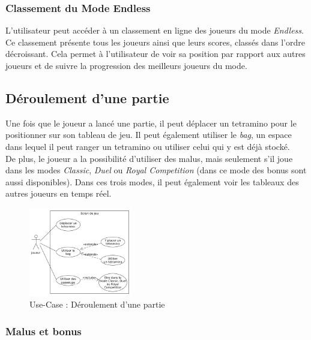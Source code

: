 \documentclass{report}
\begin{document}
\subsubsection{Classement du Mode Endless}

\noindent L'utilisateur peut accéder à un classement en ligne des joueurs du mode \emph{Endless}. Ce classement présente tous les joueurs ainsi que leurs scores, classés dans l'ordre décroissant. Cela permet à l'utilisateur de voir sa position par rapport aux autres joueurs et de suivre la progression des meilleurs joueurs du mode.





\subsection{Déroulement d’une partie}

\noindent Une fois que le joueur a lancé une partie, il peut déplacer un tetramino pour le positionner sur son tableau de jeu. Il peut également utiliser le \emph{bag}, un espace dans lequel il peut ranger un tetramino ou utiliser celui qui y est déjà stocké. \\

\noindent De plus, le joueur a la possibilité d'utiliser des malus, mais seulement s'il joue dans les modes \emph{Classic}, \emph{Duel} ou \emph{Royal Competition} (dans ce mode des bonus sont aussi disponibles). Dans ces trois modes, il peut également voir les tableaux des autres joueurs en temps réel.

\begin{figure}[H]
    \centering
     \includegraphics[width=0.4\textwidth, keepaspectratio]{src/user_req/jeu.png}
    \caption{Use-Case : Déroulement d'une partie}
    \label{fig:use_case_game}
\end{figure}

\subsubsection{Malus et bonus}
\end{document}
